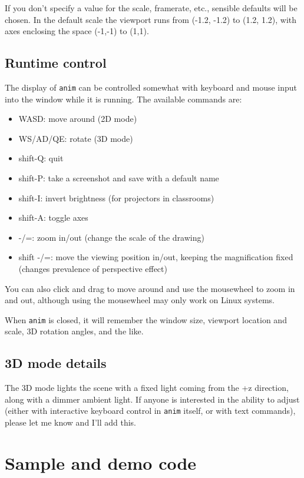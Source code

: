 \documentclass[12pt]{article}
\begin{document}
If you don't specify a value for the scale, framerate, etc., sensible defaults will be chosen. In the default scale the viewport runs from (-1.2, -1.2) to (1.2, 1.2),
with axes enclosing the space (-1,-1) to (1,1). 


\subsection{Runtime control}
The display of {\tt anim} can be controlled somewhat with keyboard and mouse input into the window while it is running. The available commands are:

\begin{itemize}
\item WASD: move around (2D mode)
\item WS/AD/QE: rotate (3D mode)
\item shift-Q: quit
\item shift-P: take a screenshot and save with a default name
\item shift-I: invert brightness (for projectors in classrooms)
\item shift-A: toggle axes
\item -/=: zoom in/out (change the scale of the drawing)
\item shift -/=: move the viewing position in/out, keeping the magnification fixed (changes prevalence of perspective effect)
\end{itemize}

You can also click and drag to move around and use the mousewheel to zoom in and out, although using the mousewheel may only work on Linux systems.

When {\tt anim} is closed, it will remember the window size, viewport location and scale,
3D rotation angles, and the like.

\subsection{3D mode details}

The 3D mode lights the scene with a fixed light coming from the +z direction, along with a dimmer ambient light. If anyone is interested in the ability to adjust (either with interactive
keyboard control in {\tt anim} itself, or with text commands), please let me know and I'll add this.

\section{Sample and demo code}
\end{document}
